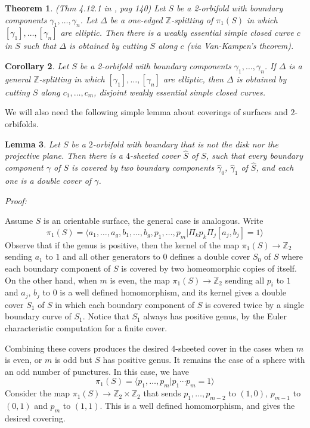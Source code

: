 \documentclass[12pt]{amsart}
\newtheorem{theorem}{Theorem}[section]
\newtheorem{lemma}[theorem]{Lemma}
\newtheorem{corollary}[theorem]{Corollary}
\newcommand{\Z}{\mathbb{Z}}
\begin{document}
\begin{theorem} \label{zvc0} (Thm 4.12.1 in \cite{zieschang}, pag 140) Let $S$ be a 2-orbifold with boundary components $\gamma_1,\ldots,\gamma_n$. Let $\Delta$ be a one-edged $\Z$-splitting of $\pi_1(S)$ in which $[\gamma_1],\ldots,[\gamma_n]$ are elliptic. Then there is a weakly essential simple closed curve $c$ in $S$ such that $\Delta$ is obtained by cutting $S$ along $c$ (via Van-Kampen's theorem). 
\end{theorem}

\begin{corollary} \label{zvc} Let $S$ be a 2-orbifold with boundary components $\gamma_1,\ldots,\gamma_n$. If $\Delta$ is a general $\Z$-splitting in which $[\gamma_1],\ldots,[\gamma_n]$ are elliptic, then $\Delta$ is obtained by cutting $S$ along $c_1,\ldots,c_m$, disjoint weakly essential simple closed curves.
\end{corollary}

We will also need the following simple lemma about coverings of surfaces and $2$-orbifolds.

\begin{lemma} \label{4cover} Let $S$ be a $2$-orbifold with boundary that is not the disk nor the projective plane. Then there is a $4$-sheeted cover $\hat S$ of $S$, such that every boundary component $\gamma$ of $S$ is covered by two boundary components $\hat \gamma_0$, $\hat \gamma_1$ of $\hat S$, and each one is a double cover of $\gamma$. 
\end{lemma} 

{\em Proof:}

Assume $S$ is an orientable surface, the general case is analogous. Write 
\[ \pi_1(S) =  \langle a_1,\ldots,a_g,b_1,\ldots,b_g,p_1,\ldots,p_m | \Pi_k p_k \Pi_j [a_j,b_j] =1 \rangle \]
Observe that if the genus is positive, then the kernel of the map $\pi_1(S) \to \Z_2$ sending $a_1$ to $1$ and all other generators to $0$ defines a double cover $S_0$ of $S$ where each boundary component of $S$ is covered by two homeomorphic copies of itself.
On the other hand, when $m$ is even, the map $\pi_1(S) \to \Z_2$ sending all $p_i$ to $1$ and $a_j$, $b_j$ to $0$ is a well defined homomorphism, and its kernel gives a double cover $S_1$ of $S$ in which each boundary component of $S$ is covered twice by a single boundary curve of $S_1$. Notice that $S_1$ always has positive genus, by the Euler characteristic computation for a finite cover.

Combining these covers produces the desired $4$-sheeted cover in the cases when $m$ is even, or $m$ is odd but $S$ has positive genus. It remains the case of a sphere with an odd number of punctures. In this case, we have 
\[ \pi_1(S) = \langle p_1,\ldots,p_m | p_1\cdots p_m = 1 \rangle \]
Consider the map  $\pi_1(S) \to \Z_2 \times \Z_2$ that sends $p_1,\ldots,p_{m-2}$ to $(1,0)$, $p_{m-1}$ to $(0,1)$ and $p_m$ to $(1,1)$. This is a well defined homomorphism, and gives the desired covering.
\end{document}
